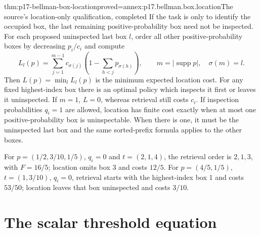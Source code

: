\begin{hbtheorem}{thm:p17-bellman-box-location}{proved=annex:p17.bellman.box.location}{The source's location-only qualification, completed}
If the task is only to identify the occupied box, the last
remaining positive-probability box need not be inspected.
For each proposed uninspected last box \(l\), order all
other positive-probability boxes by decreasing \(p_i/c_i\)
and compute
\[
 L_l(p)=\sum_{j=1}^{m-1}c_{\sigma(j)}
                 \left(1-\sum_{h<j}p_{\sigma(h)}\right),
                     \qquad m=|\operatorname{supp}p|,\quad \sigma(m)=l.
\]
Then \(L(p)=\min_l L_l(p)\) is the minimum expected
location cost. For any fixed highest-index box there
is an optimal policy which inspects it first or leaves
it uninspected. If \(m=1\), \(L=0\), whereas retrieval
still costs \(c_i\).
If inspection probabilities \(q_i=1\) are allowed, location
has finite cost exactly when at most one positive-probability
box is uninspectable. When there is one, it must be the
uninspected last box and the same sorted-prefix formula applies
to the other boxes.

For \(p=(1/2,3/10,1/5)\), \(q_i=0\) and
\(t=(2,1,4)\), the retrieval order is \(2,1,3\),
with \(F=16/5\); location omits box 3 and costs \(12/5\).
For \(p=(4/5,1/5)\), \(t=(1,3/10)\), \(q_i=0\),
retrieval starts with the highest-index box 1 and costs
\(53/50\); location leaves that box uninspected and costs \(3/10\).
\end{hbtheorem}

\section{The scalar threshold equation}

